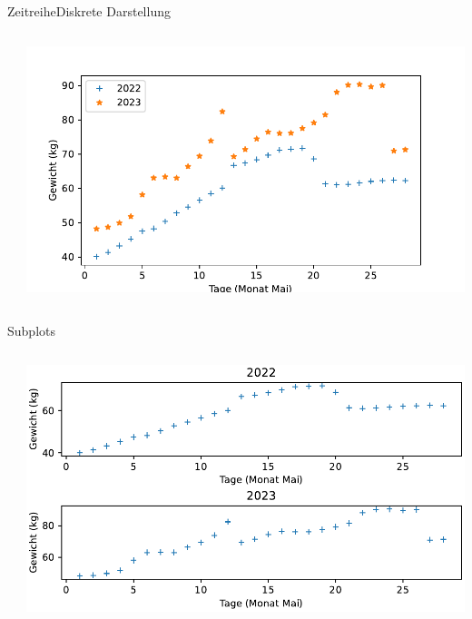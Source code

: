 \documentclass[xelatex,aspectratio=169]{beamer}
\begin{document}
\begin{frame}{Zeitreihe}{Diskrete Darstellung}
    \begin{columns}
        \begin{column}{0.5\textwidth}
            \inputminted[firstline=4]{python}{src/plt_timeseries_disc_print.py}
        \end{column}
        \begin{column}{0.5\textwidth}
            \includegraphics[width=\textwidth]{fig/plt_timeseries_disc.pdf}
        \end{column}
    \end{columns}
\end{frame}

\begin{frame}{Subplots}
    \begin{columns}
        \begin{column}{0.6\textwidth}
            \small
            \inputminted[firstline=4]{python}{src/plt_subplot.py}
        \end{column}
        \begin{column}{0.4\textwidth}
            \includegraphics[width=\textwidth]{fig/plt_subplot.pdf}
        \end{column}
    \end{columns}
\end{frame}
\end{document}
